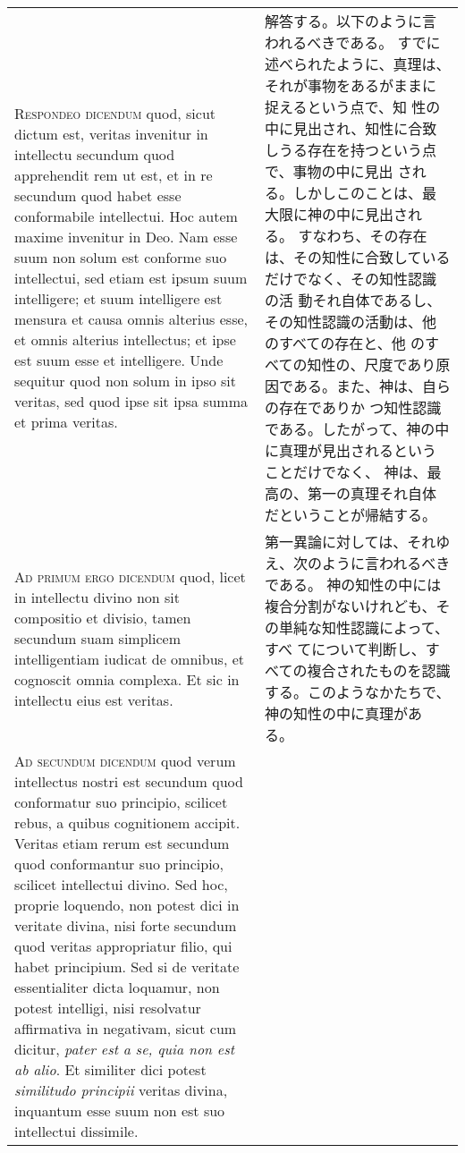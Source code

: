 \documentclass[10pt]{jsarticle} %
\begin{document}
\begin{longtable}{p{21em}p{21em}}
\\




{\scshape Respondeo dicendum} quod, sicut dictum est, veritas invenitur in
 intellectu secundum quod apprehendit rem ut est, et in re secundum quod
 habet esse conformabile intellectui. Hoc autem maxime invenitur in
 Deo. Nam esse suum non solum est conforme suo intellectui, sed etiam
 est ipsum suum intelligere; et suum intelligere est mensura et causa
 omnis alterius esse, et omnis alterius intellectus; et ipse est suum
 esse et intelligere. Unde sequitur quod non solum in ipso sit veritas,
 sed quod ipse sit ipsa summa et prima veritas.


&


解答する。以下のように言われるべきである。
すでに述べられたように、真理は、それが事物をあるがままに捉えるという点で、知
 性の中に見出され、知性に合致しうる存在を持つという点で、事物の中に見出
 される。しかしこのことは、最大限に神の中に見出される。
すなわち、その存在は、その知性に合致しているだけでなく、その知性認識の活
 動それ自体であるし、その知性認識の活動は、他のすべての存在と、他
 のすべての知性の、尺度であり原因である。また、神は、自らの存在でありか
 つ知性認識である。したがって、神の中に真理が見出されるということだけでなく、
 神は、最高の、第一の真理それ自体だということが帰結する。

\\




{\scshape Ad primum ergo dicendum} quod, licet in intellectu divino non sit
 compositio et divisio, tamen secundum suam simplicem intelligentiam
 iudicat de omnibus, et cognoscit omnia complexa. Et sic in intellectu
 eius est veritas.


&

第一異論に対しては、それゆえ、次のように言われるべきである。
神の知性の中には複合分割がないけれども、その単純な知性認識によって、すべ
 てについて判断し、すべての複合されたものを認識する。このようなかたちで、
 神の知性の中に真理がある。

\\




{\scshape Ad secundum dicendum} quod verum intellectus nostri est secundum quod
 conformatur suo principio, scilicet rebus, a quibus cognitionem
 accipit. Veritas etiam rerum est secundum quod conformantur suo
 principio, scilicet intellectui divino. Sed hoc, proprie loquendo, non
 potest dici in veritate divina, nisi forte secundum quod veritas
 appropriatur filio, qui habet principium. Sed si de veritate
 essentialiter dicta loquamur, non potest intelligi, nisi resolvatur
 affirmativa in negativam, sicut cum dicitur, {\itshape pater est a se,
 quia non est ab alio}. Et similiter dici potest {\itshape similitudo
 principii} veritas divina, inquantum esse suum non est suo intellectui
 dissimile.



\end{longtable}
\end{document}

